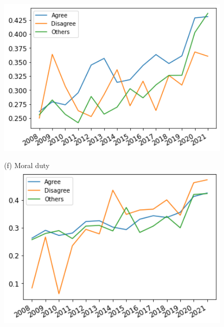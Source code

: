 \documentclass[12pt]{article}
\begin{document}
\begin{figure}[h!!]
\begin{minipage}[h!!]{0.32\textwidth}
		\includegraphics[width=1\textwidth]{../codding_data/results/liss/broad_groups_notnecessaryqk20a181_ci306.png}
	\end{minipage}
	\begin{minipage}[h!!]{0.32\textwidth}
		\centering\footnotesize{(f) Moral duty}
		\includegraphics[width=1\textwidth]{../codding_data/results/liss/broad_groups_notnecessaryqk20a183_ci306.png}
	\end{minipage}
\end{figure}
\end{document}
